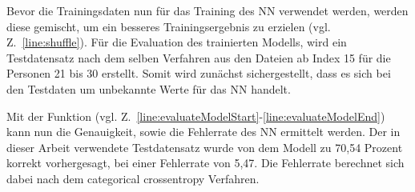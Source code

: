 Bevor die Trainingsdaten nun für das Training des \ac{NN} verwendet werden, werden diese gemischt, um ein besseres Trainingsergebnis zu erzielen (vgl. Z.~\ref{line:shuffle}).
\newline
\newline
Für die Evaluation des trainierten Modells, wird ein Testdatensatz nach dem selben Verfahren aus den Dateien ab Index 15 für die Personen 21 bis 30 erstellt.
Somit wird zunächst sichergestellt, dass es sich bei den Testdaten um unbekannte Werte für das \ac{NN} handelt.

Mit der Funktion  (vgl. Z.~\ref{line:evaluateModelStart}-\ref{line:evaluateModelEnd}) kann nun die Genauigkeit, sowie die Fehlerrate des \ac{NN} ermittelt werden.
Der in dieser Arbeit verwendete Testdatensatz wurde von dem Modell zu 70,54 Prozent korrekt vorhergesagt, bei einer Fehlerrate von 5,47.
Die Fehlerrate berechnet sich dabei nach dem categorical crossentropy Verfahren.

